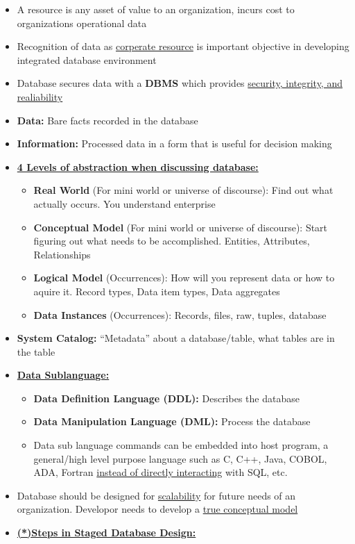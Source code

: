 \documentclass[12pt]{article}
\begin{document}
\begin{itemize}
		  \item A resource is any asset of value to an organization, incurs cost to organizations
					 operational data
		  \item Recognition of data as \underline{corperate resource} is important objective in developing
					 integrated database environment
		  \item Database secures data with a \textbf{DBMS} which provides \underline{security, integrity,
					 and realiability}
		  \item \textbf{Data:} Bare facts recorded in the database
		  \item \textbf{Information:} Processed data in a form that is useful for decision making
		  \item \textbf{\underline{4 Levels of abstraction when discussing database:}}
					 \begin{itemize}
								\item \textbf{Real World} (For mini world or universe of discourse): Find out what 
										  actually occurs. You understand enterprise
								\item \textbf{Conceptual Model} (For mini world or universe of discourse): Start
										  figuring out what needs to be accomplished. Entities, Attributes, Relationships
								\item \textbf{Logical Model} (Occurrences): How will you represent data or how to 
										  aquire it. Record types, Data item types, Data aggregates
								\item \textbf{Data Instances} (Occurrences): Records, files, raw, tuples, database
					 \end{itemize}
		  \item \textbf{System Catalog:} ``Metadata'' about a database/table, what tables are in the table
		  \item \textbf{\underline{Data Sublanguage:}}
					 \begin{itemize}
								\item \textbf{Data Definition Language (DDL):} Describes the database
								\item \textbf{Data Manipulation Language (DML):} Process the database
								\item Data sub language commands can be embedded into host program, a general/high level
										  purpose language such as C, C++, Java, COBOL, ADA, Fortran 
										  \underline{instead of directly interacting} with SQL, etc.
					 \end{itemize}
		  \item Database should be designed for \underline{scalability} for future needs of an organization. 
					 Developor needs to develop a \underline{true conceptual model}
		  \item \textbf{\underline{(*)Steps in Staged Database Design:}}



\end{itemize}
\end{document}
